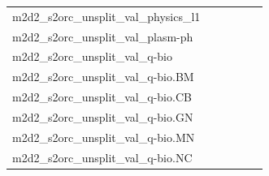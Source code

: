 \documentclass[dvipsnames]{article}
\begin{document}
\begin{appendix}
{\begin{longtable}{m{6cm}m{1.7cm}m{1.7cm}m{1.7cm}m{1.7cm}m{1.7cm}}
	m2d2\_s2orc\_unsplit\_val\_physics\_l1  & \colorbox[HTML]{f2fab5}{\makebox[\mywidth][c]{15.57}} & \colorbox[HTML]{dcf1a5}{\makebox[\mywidth][c]{15.43}} & \colorbox[HTML]{ffffe5}{\makebox[\mywidth][c]{16.97}} & \colorbox[HTML]{d5eea1}{\makebox[\mywidth][c]{15.40}} & \colorbox[HTML]{77c578}{\makebox[\mywidth][c]{15.18}}\\
	m2d2\_s2orc\_unsplit\_val\_plasm-ph  & \colorbox[HTML]{c3e698}{\makebox[\mywidth][c]{13.65}} & \colorbox[HTML]{e2f3a9}{\makebox[\mywidth][c]{13.81}} & \colorbox[HTML]{ffffe5}{\makebox[\mywidth][c]{15.77}} & \colorbox[HTML]{ceeb9e}{\makebox[\mywidth][c]{13.69}} & \colorbox[HTML]{77c578}{\makebox[\mywidth][c]{13.44}}\\
	m2d2\_s2orc\_unsplit\_val\_q-bio  & \colorbox[HTML]{bfe596}{\makebox[\mywidth][c]{13.69}} & \colorbox[HTML]{e4f4ab}{\makebox[\mywidth][c]{13.87}} & \colorbox[HTML]{ffffe5}{\makebox[\mywidth][c]{15.75}} & \colorbox[HTML]{cdeb9d}{\makebox[\mywidth][c]{13.75}} & \colorbox[HTML]{77c578}{\makebox[\mywidth][c]{13.50}}\\
	m2d2\_s2orc\_unsplit\_val\_q-bio.BM  & \colorbox[HTML]{9bd587}{\makebox[\mywidth][c]{13.28}} & \colorbox[HTML]{d9f0a3}{\makebox[\mywidth][c]{13.52}} & \colorbox[HTML]{ffffe5}{\makebox[\mywidth][c]{15.72}} & \colorbox[HTML]{c1e597}{\makebox[\mywidth][c]{13.41}} & \colorbox[HTML]{77c578}{\makebox[\mywidth][c]{13.19}}\\
	m2d2\_s2orc\_unsplit\_val\_q-bio.CB  & \colorbox[HTML]{9fd688}{\makebox[\mywidth][c]{12.06}} & \colorbox[HTML]{e5f4ab}{\makebox[\mywidth][c]{12.34}} & \colorbox[HTML]{ffffe5}{\makebox[\mywidth][c]{14.21}} & \colorbox[HTML]{c8e89a}{\makebox[\mywidth][c]{12.19}} & \colorbox[HTML]{77c578}{\makebox[\mywidth][c]{11.97}}\\
	m2d2\_s2orc\_unsplit\_val\_q-bio.GN  & \colorbox[HTML]{ffffe5}{\makebox[\mywidth][c]{13.21}} & \colorbox[HTML]{d1ec9f}{\makebox[\mywidth][c]{11.40}} & \colorbox[HTML]{ffffe5}{\makebox[\mywidth][c]{12.74}} & \colorbox[HTML]{bbe395}{\makebox[\mywidth][c]{11.32}} & \colorbox[HTML]{77c578}{\makebox[\mywidth][c]{11.16}}\\
	m2d2\_s2orc\_unsplit\_val\_q-bio.MN  & \colorbox[HTML]{e2f3a9}{\makebox[\mywidth][c]{11.96}} & \colorbox[HTML]{e0f2a8}{\makebox[\mywidth][c]{11.95}} & \colorbox[HTML]{ffffe5}{\makebox[\mywidth][c]{13.36}} & \colorbox[HTML]{d5eea1}{\makebox[\mywidth][c]{11.90}} & \colorbox[HTML]{77c578}{\makebox[\mywidth][c]{11.70}}\\
	m2d2\_s2orc\_unsplit\_val\_q-bio.NC  & \colorbox[HTML]{bfe596}{\makebox[\mywidth][c]{13.69}} & \colorbox[HTML]{e4f4ab}{\makebox[\mywidth][c]{13.87}} & \colorbox[HTML]{ffffe5}{\makebox[\mywidth][c]{15.75}} & \colorbox[HTML]{cdeb9d}{\makebox[\mywidth][c]{13.75}} & \colorbox[HTML]{77c578}{\makebox[\mywidth][c]{13.50}}\\

\end{longtable}}
\end{appendix}
\end{document}
